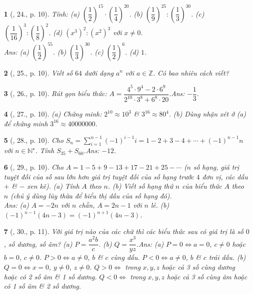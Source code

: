 \documentclass{article}
\newtheorem{baitoan}{}
\begin{document}
\begin{baitoan}[\cite{Binh_Toan_7_tap_1}, 24., p. 10]
	Tính: (a) $\left(\dfrac{1}{2}\right)^{15}\cdot\left(\dfrac{1}{4}\right)^{20}$. (b) $\left(\dfrac{1}{9}\right)^{25}:\left(\dfrac{1}{3}\right)^{30}$. (c) $\left(\dfrac{1}{16}\right)^3:\left(\dfrac{1}{8}\right)^2$. (d) $(x^3)^2:(x^2)^3$ với $x\ne 0$.\\\mbox{}\hfill{\sf Ans: (a) $\left(\dfrac{1}{2}\right)^{55}$. (b) $\left(\dfrac{1}{3}\right)^{30}$. (c) $\left(\dfrac{1}{2}\right)^6$. (d) $1$.}
\end{baitoan}

\begin{baitoan}[\cite{Binh_Toan_7_tap_1}, 25., p. 10]
	Viết số $64$ dưới dạng $a^n$ với $a\in\mathbb{Z}$. Có bao nhiêu cách viết?
\end{baitoan}

\begin{baitoan}[\cite{Binh_Toan_7_tap_1}, 26., p. 10]
	Rút gọn biểu thức: $A = \dfrac{4^5\cdot 9^4 - 2\cdot 6^9}{2^{10}\cdot 3^8 + 6^8\cdot 20}$.\hfill{\sf Ans: $-\dfrac{1}{3}$.}
\end{baitoan}

\begin{baitoan}[\cite{Binh_Toan_7_tap_1}, 27., p. 10]
	(a) Chứng minh: $2^{10}\approx 10^3$ \& $3^{16}\approx 80^4$. (b) Dùng nhận xét ở (a) để chứng minh $3^{16}\approx 40000000$.	
\end{baitoan}

\begin{baitoan}[\cite{Binh_Toan_7_tap_1}, 28., p. 10]
	Cho $S_n = \sum_{i=1}^{n-1} (-1)^{i-1}i = 1 - 2 + 3 - 4 + \cdots + (-1)^{n-1}n$ với $n\in\mathbb{N}^\star$. Tính $S_{35} + S_{60}$.\hfill{\sf Ans: $-12$.}
\end{baitoan}

\begin{baitoan}[\cite{Binh_Toan_7_tap_1}, 29., p. 10]
	Cho $A = 1 - 5 + 9 - 13 + 17 - 21 + 25 - \cdots$ ($n$ số hạng, giá trị tuyệt đối của số sau lớn hơn giá trị tuyệt đối của số hạng trước $4$ đơn vị, các dấu $+$ \& $-$ xen kẽ). (a) Tính $A$ theo $n$. (b) Viết số hạng thứ $n$ của biểu thức $A$ theo $n$ (chú ý dùng lũy thừa để biểu thị dấu của số hạng đó).\\\mbox{}\hfill{\sf Ans: (a) $A = -2n$ với $n$ chẵn, $A = 2n - 1$ với $n$ lẻ. (b) $(-1)^{n-1}(4n - 3) = (-1)^{n+1}(4n - 3)$.}
\end{baitoan}

\begin{baitoan}[\cite{Binh_Toan_7_tap_1}, 30., p. 11]
	Với giá trị nào của các chữ thì các biểu thức sau có giá trị là số $0$, số dương, số âm? (a) $P = \dfrac{a^2b}{c}$. (b) $Q = \dfrac{x^3}{yz}$.\hfill{\sf Ans: (a) $P = 0\Leftrightarrow a = 0$, $c\ne 0$ hoặc $b = 0$, $c\ne 0$. $P > 0\Leftrightarrow a\ne 0$, $b$ \& $c$ cùng dấu. $P < 0\Leftrightarrow a\ne 0$, $b$ \& $c$ trái dấu. (b) $Q = 0\Leftrightarrow x = 0$, $y\ne 0$, $z\ne 0$. $Q > 0\Leftrightarrow$ trong $x,y,z$ hoặc cả 3 số cùng dương hoặc có 2 số âm \& 1 số dương. $Q < 0\Leftrightarrow$ trong $x,y,z$ hoặc cả 3 số cùng âm hoặc có 1 số âm \& 2 số dương.}
\end{baitoan}
\end{document}
